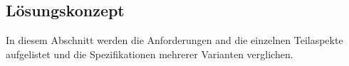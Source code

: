 \subsection{Lösungskonzept}
\label{sec:Loesungskonzept}

In diesem Abschnitt werden die Anforderungen and die einzelnen Teilaspekte aufgelistet und die Spezifikationen mehrerer Varianten verglichen.


